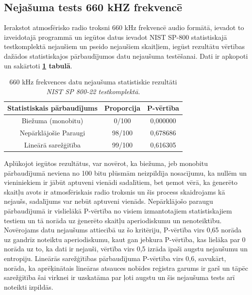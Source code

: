 \documentclass[12pt]{article}
\begin{document}

\subsection{Nejašuma tests 660 kHZ frekvencē}

    Ierakstot atmosfērisko radio troksni 660 kHz frekvencē audio formātā, ievadot to izveidotajā programmā un iegūtos datus ievadot NIST SP-800 statistiskajā testkomplektā nejaušiem un pseido nejaušiem skaitļiem, iegūst rezultātu vērtības dažādos statistiskajos pārbaudījumos datu nejaušuma testēšanai. Dati ir apkopoti un sakārtoti \textbf{\ref{rezultati_660} tabulā}.

\begin{table}[!ht]
\centering


\begin{tabular}{ |c|c|c| }%
\hline
Statistiskais pārbaudījums & Proporcija & P-vērtība \\
\hline
Biežuma (monobitu) & 0/100 & 0,000000\\
\hline
Nepārklājošie Paraugi & 98/100 & 0,678686 \\
\hline
Lineārā sarežģītība & 99/100 & 0,616305 \\
\hline
\end{tabular}

\caption{660 kHz frekvences datu nejaušuma statistiskie rezultāti \\ \emph{NIST SP 800-22 testkomplektā}.\parencite{NIST_orig}}

\label{rezultati_660}
\end{table}

  \FloatBarrier
    Aplūkojot iegūtos rezultātus, var novērot, ka  biežuma, jeb monobitu pārbaudījumā neviena no 100 bitu plūsmām neizpildīja nosacījumu, ka nullēm un vieniniekiem ir jābūt aptuveni vienādi sadalītiem, bet ņemot vērā, ka ģenerēto skaitļu avots ir atmosfēriskais radio troksnis un šis process skaidrojams kā nejaušs, sadalījums var nebūt aptuveni vienāds. Nepārklājošo paraugu pārbaudījumā ir vislielākā P-vērtība no visiem izmantotajiem statistiskajiem testiem un tā norāda uz ģenerēto skaitļu aperiodiskumu un nenoteiktību. Novērojams datu nejaušums attiecībā uz šo kritēriju, P-vērtība virs 0,65 norāda uz gandrīz noteiktu aperiodiskumu, kaut gan jebkura P-vērtība, kas lielāka par 0 norāda uz to, ka dati ir nejauši, vērtība virs 0,5 izrāda īpaši augstu nejaušumu un entropiju.
    Lineārās sarežģītības pārbaudījuma P-vērtība virs 0,6, savukārt, norāda, ka aprēķinātais lineāras atsauces nobīdes reģistra garums ir garš un tāpēc sarežģītība šai virknei ir uzskatāma par ļoti augstu un šis nejaušuma tests arī noteikti izpildās.
\end{document}

